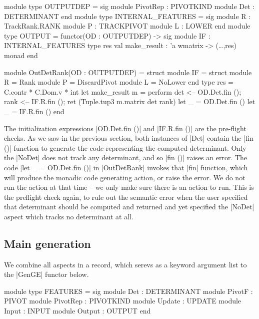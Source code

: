\documentclass[draft]{elsart}
\begin{document}
\begin{code2}
module type OUTPUTDEP = sig 
    module PivotRep : PIVOTKIND 
    module Det      : DETERMINANT
end
module type INTERNAL_FEATURES = sig
  module R      : TrackRank.RANK
  module P      : TRACKPIVOT
  module L      : LOWER
end
module type OUTPUT = functor(OD : OUTPUTDEP) -> sig
  module IF : INTERNAL_FEATURES
  type res
  val make_result : 'a wmatrix -> (\dots,res) monad
end

module OutDetRank(OD : OUTPUTDEP) = struct
  module IF = struct
      module R   = Rank
      module P   = DiscardPivot
      module L   = NoLower end
  type res = C.contr * C.Dom.v * int
  let make_result m = perform
    det  <-- OD.Det.fin ();
    rank <-- IF.R.fin ();
    ret (Tuple.tup3 m.matrix det rank)
  let _ = OD.Det.fin ()
  let _ = IF.R.fin ()
end
\end{code2}

The initialization expressions |OD.Det.fin ()| and |IF.R.fin ()| are
the pre-flight checks. As we saw in the previous section, 
both instances of |Det| contain the |fin ()| function to generate the
code representing the computed determinant. Only the |NoDet| does not
track any determinant, and so |fin ()| raises an error. The code 
|let _ = OD.Det.fin ()| in |OutDetRank| invokes that |fin| function, which will
produce the monadic code generating action, or raise the error. We do
not run the action at that time -- we only make sure there is an
action to run. This is the preflight check again, to rule out the
semantic error when the user specified that determinant should be computed
and returned and yet specified the |NoDet| aspect which tracks no
determinant at all.

\subsection{Main generation}
We combine all aspects in a record, which serevs as a keyword
argument list to the |GenGE| functor below.
\begin{code}
module type FEATURES = sig
  module Det       : DETERMINANT
  module PivotF    : PIVOT
  module PivotRep  : PIVOTKIND
  module Update    : UPDATE
  module Input     : INPUT
  module Output    : OUTPUT
end
\end{code}
\end{document}
